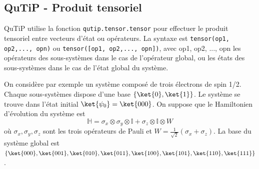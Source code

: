 \subsection{QuTiP - Produit tensoriel} 
\label{sec:tensor}

QuTiP utilise la fonction \texttt{qutip.tensor.tensor} pour effectuer le 
produit tensoriel entre vecteurs d'état ou opérateurs. La syntaxe est 
\texttt{tensor(op1, op2,..., opn)} ou \texttt{tensor([op1, op2,..., opn])}, 
avec op1, op2, ..., opn les opérateurs des sous-systèmes dans le cas 
de l'opérateur global, ou les états des sous-systèmes dans le cas de l'état 
global du système.

On considère par exemple un système composé de trois électrons de spin 1/2. 
Chaque sous-systèmes dispose d'une base $\{\ket{0},\ket{1}\}$. Le système se 
trouve dans l'état initial $\ket{\psi_0}=\ket{000}$. On suppose que le 
Hamiltonien d'évolution du système est 
\begin{equation}
\mathbb{H} = 
\sigma_x\otimes\sigma_y\otimes\mathbb{I}+\sigma_z\otimes\mathbb{I}\otimes W
\end{equation}
où $\sigma_x,\sigma_y,\sigma_z$ sont les trois opérateurs de Pauli et 
$W=\frac{1}{\sqrt{2}}(\sigma_x+\sigma_z)$. La base du système global est 
$\{\ket{000},\ket{001},\ket{010},\ket{011},\ket{100},\ket{101},\ket{110},\ket{
111}\}$.

